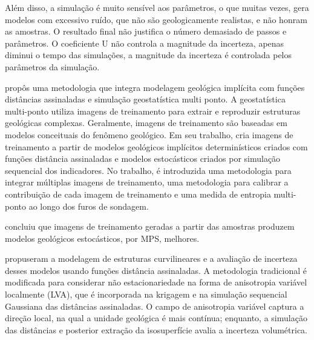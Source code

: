 Além disso, a simulação é muito sensível aos parâmetros, o que muitas vezes, gera modelos com excessivo ruído, que não são geologicamente realistas, e não honram as amostras. O resultado final não justifica o número demasiado de passos e parâmetros. O coeficiente U não controla a magnitude da incerteza, apenas diminui o tempo das simulações, a magnitude da incerteza é controlada pelos parâmetros da simulação.


 propôs uma metodologia que integra modelagem geológica implícita com funções distâncias assinaladas e simulação geostatística multi ponto. A geostatística multi-ponto utiliza imagens de treinamento para extrair e reproduzir estruturas geológicas complexas. Geralmente, imagens de treinamento são baseadas em modelos conceituais do fenômeno geológico. Em seu trabalho,  cria imagens de treinamento a partir de modelos geológicos implícitos determinísticos criados com funções distância assinaladas e modelos estocásticos criados por simulação sequencial dos indicadores. No trabalho, é introduzida uma metodologia  para integrar múltiplas imagens de treinamento, uma metodologia para calibrar a contribuição de cada imagem de treinamento e uma medida de entropia multi-ponto ao longo dos furos de sondagem.

 concluiu que imagens de treinamento geradas a partir das amostras produzem modelos geológicos estocásticos, por MPS, melhores.


 propuseram a modelagem de estruturas curvilineares e a avaliação de incerteza desses modelos usando funções distância assinaladas. A metodologia tradicional é modificada para considerar não estacionariedade na forma de anisotropia variável localmente (LVA), que é incorporada na krigagem e na simulação sequencial Gaussiana das distâncias assinaladas. O campo de anisotropia variável captura a direção local, na qual a unidade geológica é mais contínua; enquanto, a simulação das distâncias e posterior extração da isosuperfície avalia a incerteza volumétrica.


